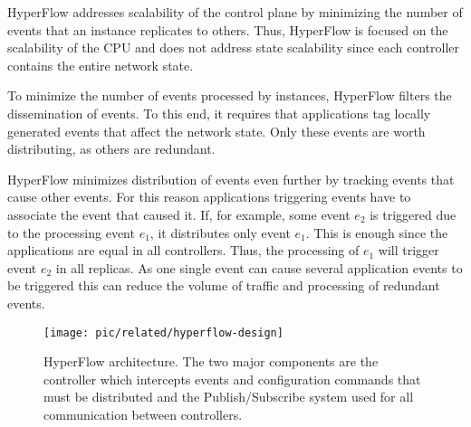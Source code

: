 
HyperFlow addresses scalability of the control plane by minimizing the number of events that an instance replicates to others. 
Thus, HyperFlow  is focused  on the scalability of the CPU and does not address state scalability since  each controller contains  the entire network state. 

To minimize the number of events  processed by instances, HyperFlow filters the dissemination of events.  
To this end, it requires that applications tag locally generated events that affect the network state.   
Only these events are worth distributing,  as others are redundant. 


HyperFlow minimizes distribution of events even further by tracking events that cause other events. 
For this reason applications triggering events have to  associate the event that caused it. 
If, for example, some event $e_2$ is triggered due to the processing event $e_1$, it  distributes only event $e_1$. 
This is enough since the applications are equal in all controllers. 
Thus,  the processing of $e_1$ will  trigger event $e_2$ in all replicas. 
As one single event can cause several application events to be triggered this can reduce the volume of traffic and processing of redundant events.

\begin{figure}
  \centering 
  \footnotesize
  \texttt{[image: pic/related/hyperflow-design]}
  \caption[HyperFlow architecture]{HyperFlow architecture. The two major components are the controller which intercepts events and configuration commands that must be distributed and the Publish/Subscribe system used for all communication between controllers.} 
  \label{fig:hyperflow-design}
\end{figure}

